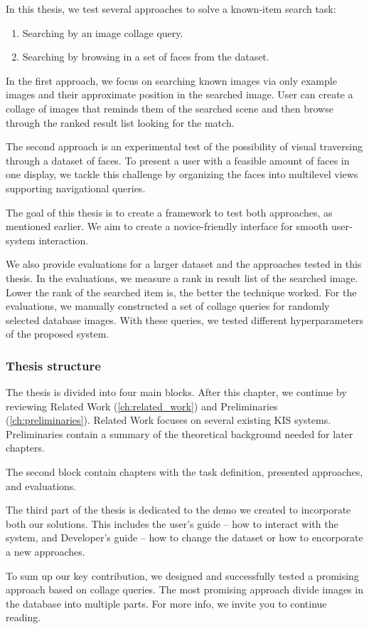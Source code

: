 In this thesis, we test several approaches to solve a known-item search task:

\begin{enumerate}
  \item Searching by an image collage query.
  \item Searching by browsing in a set of faces from the dataset.
\end{enumerate}

In the first approach, we focus on searching known images via only example images and their approximate position in the searched image. User can create a collage of images that reminds them of the searched scene and then browse through the ranked result list looking for the match.

The second approach is an experimental test of the possibility of visual traversing through a dataset of faces. To present a user with a feasible amount of faces in one display, we tackle this challenge by organizing the faces into multilevel views supporting navigational queries.

The goal of this thesis is to create a framework to test both approaches, as mentioned earlier. We aim to create a novice-friendly interface for smooth user-system interaction.

We also provide evaluations for a larger dataset and the approaches tested in this thesis. In the evaluations, we measure a rank in result list of the searched image. Lower the rank of the searched item is, the better the technique worked. For the evaluations, we manually constructed a set of collage queries for randomly selected database images. With these queries, we  tested different hyperparameters of the proposed system.

\subsubsection*{Thesis structure}

The thesis is divided into four main blocks. After this chapter, we continue by reviewing Related Work (\autoref{ch:related_work}) and Preliminaries (\autoref{ch:preliminaries}). Related Work focuses on several existing  KIS systems. Preliminaries contain a summary of the theoretical background needed for later chapters.

The second block contain chapters with the task definition, presented approaches, and evaluations.

The third part of the thesis is dedicated to the demo we created to incorporate both our solutions. This includes the user's guide -- how to interact with the system, and Developer's guide -- how to change the dataset or how to encorporate a new approaches.

\bigskip
To sum up our key contribution, we designed and successfully tested a promising approach based on collage queries. The most promising approach divide images in the database into multiple parts. For more info, we invite you to continue reading.